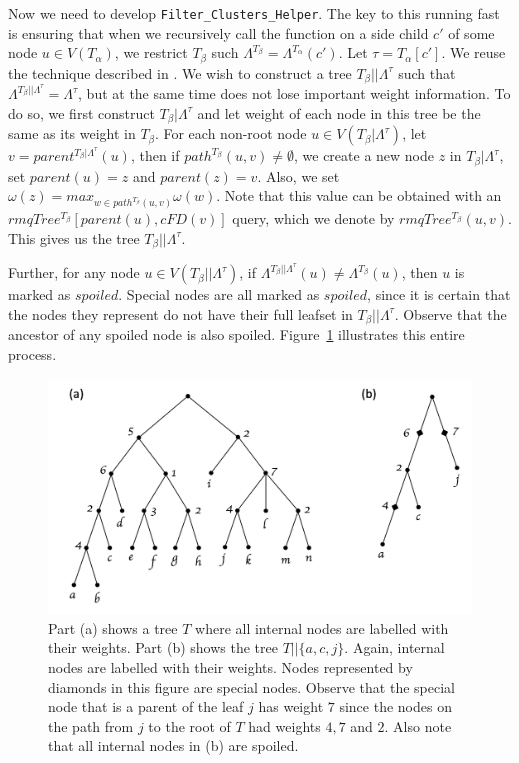 \documentclass{article}
\newcommand{\leafset}{\Lambda}
\newcommand{\weight}{\omega}
\newcommand{\TA}{T_\alpha}
\newcommand{\TB}{T_\beta}
\begin{document}
    Now we need to develop \texttt{Filter\_Clusters\_Helper}. The key to this running fast is ensuring that when we recursively call the function on a side child $c'$ of some node $u \in V(\TA)$, we restrict $\TB$ such $\leafset^{\TB} = \leafset^{\TA}(c')$. Let $\tau = \TA[c']$. We reuse the technique described in \cite{jansson2018algorithms}. We wish to construct a tree $\TB||\leafset^{\tau}$ such that $\leafset^{\TB||\leafset^{\tau}} = \leafset^{\tau}$, but at the same time does not lose important weight information. To do so, we first construct $\TB|\leafset^{\tau}$ and let weight of each node in this tree be the same as its weight in $\TB$. For each non-root node $u \in V(\TB|\leafset^{\tau})$, let $v = parent^{\TB|\leafset^{\tau}}(u)$, then if $path^{\TB}(u, v) \neq \emptyset$, we create a new node $z$ in $\TB|\leafset^{\tau}$, set $parent(u) = z$ and $parent(z) = v$. Also, we set $\weight(z) = max_{w \in path^{\TB}(u, v)} \weight(w)$. Note that this value can be obtained with an $rmqTree^{\TB}[parent(u), cFD(v)]$ query, which we denote by $rmqTree^{\TB}(u, v)$. This gives us the tree $\TB||\leafset^{\tau}$.

    Further, for any node $u \in V(\TB||\leafset^{\tau})$, if $\leafset^{\TB||\leafset^{\tau}}(u) \neq \leafset^{\TB}(u)$, then $u$ is marked as $spoiled$. Special nodes are all marked as $spoiled$, since it is certain that the nodes they represent do not have their full leafset in $\TB||\leafset^{\tau}$. Observe that the ancestor of any spoiled node is also spoiled. Figure~\ref{fig:specialnodes} illustrates this entire process.

    \begin{figure}[h]
        \includegraphics[scale=0.5]{specialnodes}
        \centering
        \caption{Part (a) shows a tree $T$ where all internal nodes are labelled with their weights. Part (b) shows the tree $T||\{a, c, j\}$. Again, internal nodes are labelled with their weights. Nodes represented by diamonds in this figure are special nodes. Observe that the special node that is a parent of the leaf $j$ has weight $7$ since the nodes on the path from $j$ to the root of $T$ had weights $4, 7$ and $2$. Also note that all internal nodes in (b) are spoiled.}
        \label{fig:specialnodes}
    \end{figure}
\end{document}

